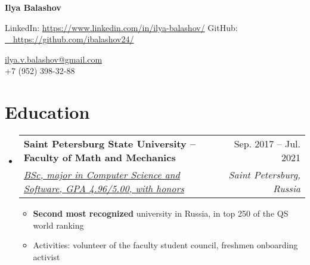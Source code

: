 \documentclass[letterpaper,11pt]{article}
\makeatletter
\newcommand{\resumeItem}[1]{
  \item\small{
    {#1 \vspace{-2pt}}
  }
}
\newcommand{\resumeSubheading}[4]{
  \vspace{-2pt}\item
    \begin{tabular*}{0.97\textwidth}[t]{l@{\extracolsep{\fill}}r}
      \textbf{\vspace{-3pt}#1} & #2 \\
      \textit{\small#3} & \textit{\small \vspace{3pt} #4} \\
    \end{tabular*}\vspace{-7pt}
}
\newcommand{\resumeSubHeadingListStart}{\begin{itemize}[leftmargin=0.15in, label={}]}
\newcommand{\resumeSubHeadingListEnd}{\end{itemize}}
\newcommand{\resumeItemListStart}{\begin{itemize}}
\newcommand{\resumeItemListEnd}{\end{itemize}\vspace{-5pt}}
\makeatother
\begin{document}
\begin{center}
    {\Huge \textbf{Ilya Balashov}} \\ \vspace{2pt}
    \begin{multicols}{2}
    \begin{flushleft}
    LinkedIn: \href{{https://www.linkedin.com/in/ibalashov24/}}{ https://www.linkedin.com/in/ilya-balashov/}
    GitHub: \href{{https://github.com/ibalashov24/}}{\ \  https://github.com/ibalashov24/} \\
    \end{flushleft}
    
    \begin{flushright}
    \href{mailto:{ilya.v.balashov@gmail.com}}{ilya.v.balashov@gmail.com}\\
    +7 (952) 398-32-88
    
    \end{flushright}
    \end{multicols}
\end{center}


\vspace{-20pt}
\section{\textbf{Education}}
  \resumeSubHeadingListStart
      \resumeSubheading
      {Saint Petersburg State University -- Faculty of Math and Mechanics}{Sep. 2017 -- Jul. 2021}
      {\href{https://diploma.spbu.ru/en?rn=0911006\&bd=19990809\&h=c41f9286a9064c78a1ef2309af6be0eb}
      {BSc, major in Computer Science and Software, GPA 4.96/5.00, with honors}}{Saint Petersburg, Russia}
      \resumeItemListStart
      	\resumeItem{\textbf{Second most recognized} university in Russia, in top 250 of the QS world ranking}{}
      	\resumeItem{Activities: volunteer of the faculty student council, freshmen onboarding activist}{}
      \resumeItemListEnd
  \resumeSubHeadingListEnd


\vspace{-17pt}
\end{document}
